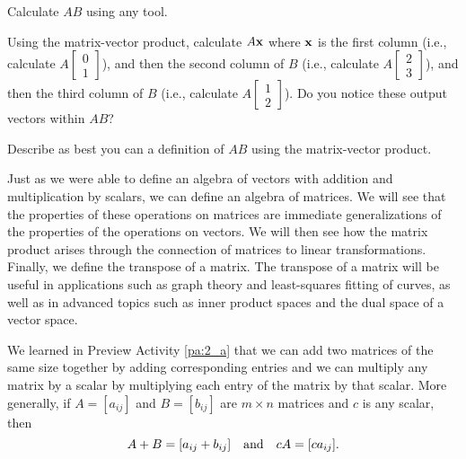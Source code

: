 \begin{pa}
\ba
\item Calculate $AB$ using any tool.

\item Using the matrix-vector product, calculate $A \mathbf{x}$ where $\mathbf{x}$ is the first column (i.e., calculate $A\begin{bmatrix} 0 \\ 1\end{bmatrix}$), and then the second column of $B$ (i.e., calculate $A\begin{bmatrix} 2 \\ 3\end{bmatrix}$), and then the third column of $B$ (i.e., calculate $A\begin{bmatrix} 1 \\ 2\end{bmatrix}$). Do you notice these output vectors within $AB$?

\item Describe as best you can a definition of $AB$ using the matrix-vector product.

\ea
\ee

\end{pa}



\label{sec:mtx_add_smult}

Just as we were able to define an algebra of vectors with addition and multiplication by scalars, we can define an algebra of matrices. We will see that the properties of these operations on matrices are immediate generalizations of the properties of the operations on vectors. We will then see how the matrix product arises through the connection of matrices to linear transformations. Finally, we define the transpose of a matrix. The transpose of a matrix will be useful in applications such as graph theory and least-squares fitting of curves, as well as in advanced topics such as inner product spaces and the dual space of a vector space.

We learned in Preview Activity \ref{pa:2_a} that we can add two matrices of the same size together by adding corresponding entries and we can multiply any matrix by a scalar by multiplying each entry of the matrix by that scalar. More generally, if $A = [a_{ij}]$ and $B = [b_{ij}]$ are $m \times n$ matrices and $c$ is any scalar, then  
\[A + B = [a_{ij}+b_{ij}] \ \ \text{ and } \ \ cA = [ca_{ij}].\index{matrix!sum}\]

